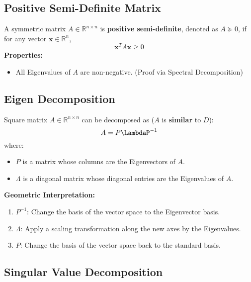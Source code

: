 \documentclass{article}
\begin{document}
\subsection{Positive Semi-Definite Matrix}
A symmetric matrix $A \in \mathbb{R}^{n \times n}$ is \textbf{positive semi-definite}, denoted as $A \succeq 0$, if for any vector $\mathbf{x} \in \mathbb{R}^n$,
\[
    \mathbf{x}^T A \mathbf{x} \geq 0
\]
\textbf{Properties:}
\begin{itemize}
    \item All Eigenvalues of $A$ are non-negative. (Proof via Spectral Decomposition)
\end{itemize}

\subsection{Eigen Decomposition}

Square matrix $A \in \mathbb{R}^{n \times n}$ can be decomposed as ($A$ is \textbf{similar} to $D$):
\[
    A = P \LambdaP ^{-1}
\]
where:
\begin{itemize}
    \item $P$ is a matrix whose columns are the Eigenvectors of $A$.
    \item $\Lambda$ is a diagonal matrix whose diagonal entries are the Eigenvalues of $A$.
\end{itemize}
\textbf{Geometric Interpretation:}
\begin{enumerate}
    \item $P^{-1}$: Change the basis of the vector space to the Eigenvector basis.
    \item $\Lambda$: Apply a scaling transformation along the new axes by the Eigenvalues.
    \item $P$: Change the basis of the vector space back to the standard basis.
\end{enumerate}

\subsection{Singular Value Decomposition}
\end{document}
